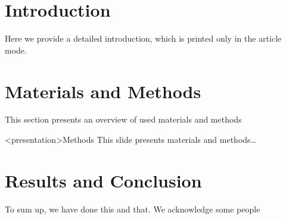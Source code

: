 



\maketitle           %
\frame{\titlepage}   %


\section{Introduction}
  Here we provide a detailed introduction, which is printed only in the article mode.


\section{Materials and Methods}
  This section presents an overview of used materials and methods
  \begin{frame}<presentation>{Methods}
    This slide presents materials and methods\ldots
  \end{frame}



\section{Results and Conclusion}
  To sum up, we have done this and that. We acknowledge some people





